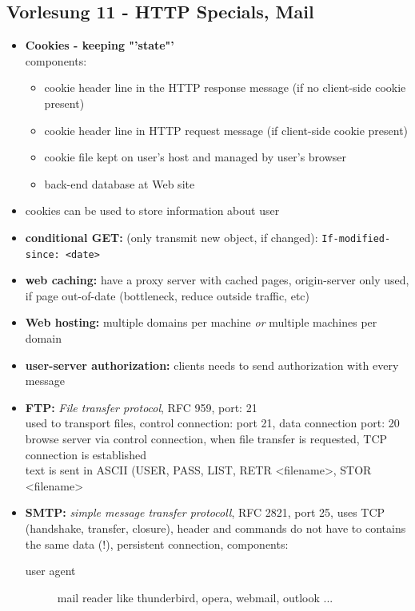 \subsection*{Vorlesung 11 - HTTP Specials, Mail}
 \begin{itemize}
  \item \textbf{Cookies - keeping "'state"'} \\ 
  components:
  \begin{itemize}
   \item cookie header line in the HTTP response message (if no client-side cookie present)
   \item cookie header line in HTTP request message (if client-side cookie present)
   \item cookie file kept on user's host and managed by user's browser
   \item back-end database at Web site
  \end{itemize}
  \item cookies can be used to store information about user
  \item \textbf{conditional GET:} (only transmit new object, if changed): \texttt{If-modified-since: <date>}
  \item \textbf{web caching:} have a proxy server with cached pages, origin-server only used, if page out-of-date (bottleneck, reduce outside traffic, etc)
  \item \textbf{Web hosting:} multiple domains per machine \textit{or} multiple machines per domain
  \item \textbf{user-server authorization:} clients needs to send authorization with every message
  \item \textbf{FTP:} \textit{File transfer protocol}, RFC 959, port: 21 \\
  used to transport files, control connection: port 21, data connection port: 20 \\
  browse server via control connection, when file transfer is requested, TCP connection is established \\
  text is sent in ASCII (USER, PASS, LIST, RETR <filename>, STOR <filename>
  \item \textbf{SMTP:} \textit{simple message transfer protocoll}, RFC 2821, port 25, uses TCP (handshake, transfer, closure), header and commands do not have to contains the same data (!), persistent connection, components:
  \begin{description}
   \item[user agent] mail reader like thunderbird, opera, webmail, outlook ... \\

\end{description}
\end{itemize}
